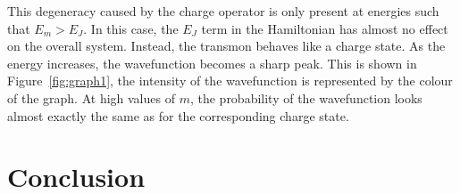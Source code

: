 \documentclass[11pt]{article}
\begin{document}
This degeneracy caused by the charge operator is only present at energies such that $E_m > E_J$. In this case, the $E_J$ term in the Hamiltonian has almost no effect on the overall system. Instead, the transmon behaves like a charge state.  As the energy increases, the wavefunction becomes a sharp peak. This is shown in Figure~\ref{fig:graph1}, the intensity of the wavefunction is represented by the colour of the graph. At high values of $m$, the probability of the wavefunction looks almost exactly the same as for the corresponding charge state.

\section{Conclusion}
\end{document}

